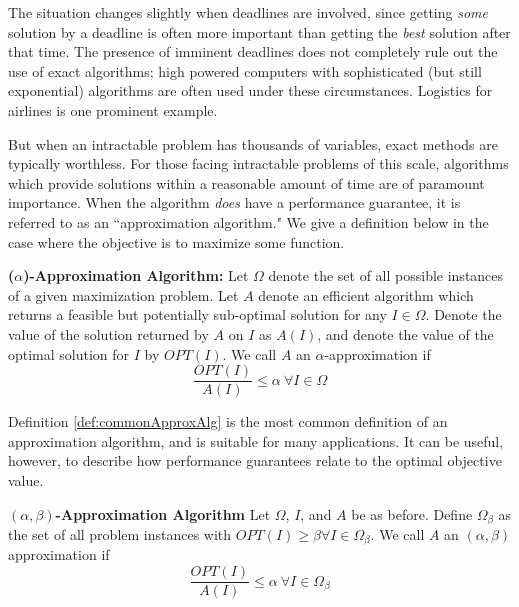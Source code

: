 The situation changes slightly when deadlines are involved, since getting \textit{some} solution by a deadline is often more important than getting the \textit{best} solution after that time. 
The presence of imminent deadlines does not completely rule out the use of exact algorithms; high powered computers with sophisticated (but still exponential) algorithms are often used under these circumstances. 
Logistics for airlines is one prominent example.

But when an intractable problem has thousands of variables, exact methods are typically worthless. 
For those facing intractable problems of this scale, algorithms which provide solutions within a reasonable amount of time are of paramount importance.  
When the algorithm \textit{does} have a performance guarantee, it is referred to as an ``approximation algorithm."
We give a definition below in the case where the objective is to maximize some function. 

\begin{definition}
\textbf{($\alpha$)-Approximation Algorithm: } Let $\Omega$ denote the set of all possible instances of a given maximization problem. 
Let $A$ denote an efficient algorithm which returns a feasible but potentially sub-optimal solution for any $I \in \Omega$. 
Denote the value of the solution returned by $A$ on $I$ as $A(I)$, and denote the value of the optimal solution for $I$ by $OPT(I)$. We call $A$ an $\alpha$-approximation if
\begin{equation*}
\frac{OPT(I)}{A(I)} \leq \alpha ~ \forall I \in \Omega
\end{equation*}
\label{def:commonApproxAlg}
\end{definition}

Definition \ref{def:commonApproxAlg} is the most common definition of an approximation algorithm, and is suitable for many applications. It can be useful, however, to describe how performance guarantees relate to the optimal objective value. 
\begin{definition}
\textbf{$(\alpha,\beta)$-Approximation Algorithm } Let $\Omega$, $I$, and $A$ be as before. 
Define $\Omega_\beta$ as the set of all problem instances with $OPT(I) \geq \beta \forall I \in \Omega_\beta$.
We call $A$ an $(\alpha,\beta)$ approximation if 
\begin{equation*}
\frac{OPT(I)}{A(I)} \leq \alpha ~ \forall I \in \Omega_{\beta}
\end{equation*}
\label{def:twoParamApproxAlg}
\end{definition}


